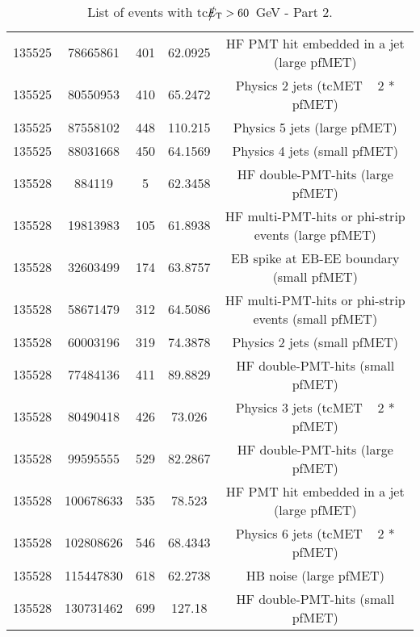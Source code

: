 \begin{table}[htbp]
\begin{center}
\begin{tabular}{|c|c|c|c|c|}
      135525  & 78665861     & 401  &    62.0925 & HF PMT hit embedded in a jet (large pfMET) \\
      135525  & 80550953     & 410  &    65.2472 & Physics 2 jets (tcMET ~ 2 * pfMET) \\
      135525  & 87558102     & 448  &    110.215 & Physics 5 jets (large pfMET) \\ 
      135525  & 88031668     & 450  &    64.1569 & Physics 4 jets (small pfMET) \\
      135528  & 884119       & 5    &    62.3458 & HF double-PMT-hits (large pfMET) \\
      135528  & 19813983     & 105  &    61.8938 & HF multi-PMT-hits or phi-strip events (large pfMET) \\
      135528  & 32603499     & 174  &    63.8757 & EB spike at EB-EE boundary (small pfMET) \\
      135528  & 58671479     & 312  &    64.5086 & HF multi-PMT-hits or phi-strip events (small pfMET) \\
      135528  & 60003196     & 319  &    74.3878 & Physics 2 jets (small pfMET) \\
      135528  & 77484136     & 411  &    89.8829 & HF double-PMT-hits (small pfMET) \\
      135528  & 80490418     & 426  &    73.026  & Physics 3 jets (tcMET ~ 2 * pfMET) \\
      135528  & 99595555     & 529  &    82.2867 & HF double-PMT-hits (large pfMET) \\
      135528  & 100678633    & 535  &    78.523  & HF PMT hit embedded in a jet (large pfMET) \\
      135528  & 102808626    & 546  &    68.4343 & Physics 6 jets (tcMET ~ 2 * pfMET) \\
      135528  & 115447830    & 618  &    62.2738 & HB noise (large pfMET) \\
      135528  & 130731462    & 699  &    127.18  & HF double-PMT-hits (small pfMET) \\
      \hline
    \end{tabular}
    \caption{List of events with tc$\big\slash\hspace{-1.6ex}{E_\text{T}}>60$~GeV - Part 2.}        
    \label{tab:tcMETlist2}
  \end{center}
\end{table}



